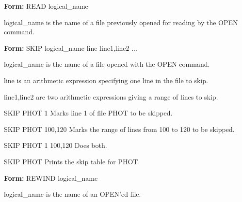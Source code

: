 {\newpage\clearpage
{}%
\begin{command}
  \item[\textbf{Form: }READ logical\_name\hfill]{}
  \item[logical\_name]{is the name of a file previously
       opened for reading by the OPEN command.}
\end{command}%
\lthtmlfigureZ
\lthtmlcheckvsize\clearpage}

{\newpage\clearpage
{}%
\begin{command}
  \item[\textbf{Form: }SKIP logical\_name line line1,line2 ...\hfill]{}
  \item[logical\_name]{is the name of a file opened with the OPEN command.}
  \item[line]{is an arithmetic expression specifying one line in the file
       to skip.}  
  \item[line1,line2]{are two arithmetic expressions giving a range of lines
       to skip.}
\end{command}%
\lthtmlfigureZ
\lthtmlcheckvsize\clearpage}

{\newpage\clearpage
{}%
\begin{example}
  \item[SKIP PHOT 1]{Marks line 1 of file PHOT to be skipped.}
  \item[SKIP PHOT 100,120]{Marks the range of lines from 100 to 120 to 
       be skipped.}
  \item[SKIP PHOT 1 100,120]{Does both.}
  \item[SKIP PHOT]{Prints the skip table for PHOT.}
\end{example}%
\lthtmlfigureZ
\lthtmlcheckvsize\clearpage}

{\newpage\clearpage
{}%
\begin{command}
  \item[\textbf{Form: }REWIND logical\_name\hfill]{}
  \item[logical\_name]{is the name of an OPEN'ed file.}
\end{command}%
\lthtmlfigureZ
\lthtmlcheckvsize\clearpage}

